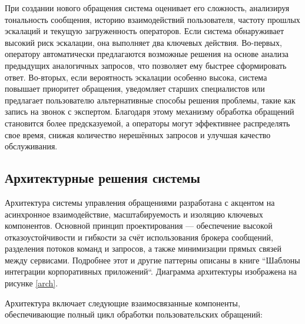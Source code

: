 При создании нового обращения система оценивает его сложность, анализируя тональность сообщения, историю взаимодействий пользователя, частоту прошлых эскалаций и текущую загруженность операторов. Если система обнаруживает высокий риск эскалации, она выполняет два ключевых действия. Во-первых, оператору автоматически предлагаются возможные решения на основе анализа предыдущих аналогичных запросов, что позволяет ему быстрее сформировать ответ. Во-вторых, если вероятность эскалации особенно высока, система повышает приоритет обращения, уведомляет старших специалистов или предлагает пользователю альтернативные способы решения проблемы, такие как запись на звонок с экспертом. Благодаря этому механизму обработка обращений становится более предсказуемой, а операторы могут эффективнее распределять свое время, снижая количество нерешённых запросов и улучшая качество обслуживания.

\subsection{Архитектурные решения системы}

Архитектура системы управления обращениями разработана с акцентом на асинхронное взаимодействие, масштабируемость и изоляцию ключевых компонентов. Основной принцип проектирования — обеспечение высокой отказоустойчивости и гибкости за счёт использования брокера сообщений, разделения потоков команд и запросов, а также минимизации прямых связей между сервисами. Подробнее этот и другие паттерны описаны в книге ``Шаблоны интеграции корпоративных приложений``\cite{hohpe2003enterprise}. Диаграмма архитектуры изображена на рисунке \ref{arch}.


Архитектура включает следующие взаимосвязанные компоненты, обеспечивающие полный цикл обработки пользовательских обращений:


